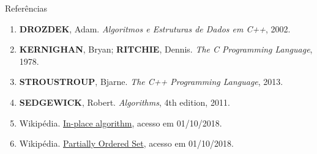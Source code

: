 \begin{frame}[fragile]{Referências}

    \begin{enumerate}
        \item \textbf{DROZDEK}, Adam. \textit{Algoritmos e Estruturas de Dados em C++}, 2002.

        \item \textbf{KERNIGHAN}, Bryan; \textbf{RITCHIE}, Dennis. \textit{The C Programming Language}, 1978.

        \item \textbf{STROUSTROUP}, Bjarne. \textit{The C++ Programming Language}, 2013.

        \item \textbf{SEDGEWICK}, Robert. \textit{Algorithms}, 4th edition, 2011.

        \item Wikipédia. \href{https://en.wikipedia.org/wiki/In-place\_algorithm}{In-place algorithm}, acesso em 01/10/2018.

        \item Wikipédia. \href{https://en.wikipedia.org/wiki/Partially\_ordered\_set}{Partially Ordered Set}, acesso em 01/10/2018.

    \end{enumerate}

\end{frame}
